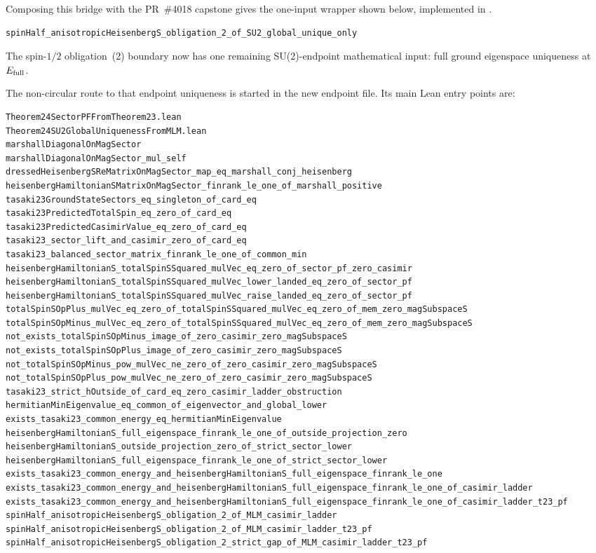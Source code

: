 \documentclass[a4paper,11pt]{article}
\begin{document}
Composing this bridge with the PR~\#4018 capstone gives the one-input wrapper
shown below, implemented in
.
\begin{Verbatim}
spinHalf_anisotropicHeisenbergS_obligation_2_of_SU2_global_unique_only
\end{Verbatim}
The spin-\(1/2\) obligation~(2) boundary now has one remaining SU(2)-endpoint
mathematical input: full ground eigenspace uniqueness at \(E_{\rm full}\).

The non-circular route to that endpoint uniqueness is started in the new
endpoint file.  Its main Lean entry points are:
\begin{Verbatim}
Theorem24SectorPFFromTheorem23.lean
Theorem24SU2GlobalUniquenessFromMLM.lean
marshallDiagonalOnMagSector
marshallDiagonalOnMagSector_mul_self
dressedHeisenbergSReMatrixOnMagSector_map_eq_marshall_conj_heisenberg
heisenbergHamiltonianSMatrixOnMagSector_finrank_le_one_of_marshall_positive
tasaki23GroundStateSectors_eq_singleton_of_card_eq
tasaki23PredictedTotalSpin_eq_zero_of_card_eq
tasaki23PredictedCasimirValue_eq_zero_of_card_eq
tasaki23_sector_lift_and_casimir_zero_of_card_eq
tasaki23_balanced_sector_matrix_finrank_le_one_of_common_min
heisenbergHamiltonianS_totalSpinSSquared_mulVec_eq_zero_of_sector_pf_zero_casimir
heisenbergHamiltonianS_totalSpinSSquared_mulVec_lower_landed_eq_zero_of_sector_pf
heisenbergHamiltonianS_totalSpinSSquared_mulVec_raise_landed_eq_zero_of_sector_pf
totalSpinSOpPlus_mulVec_eq_zero_of_totalSpinSSquared_mulVec_eq_zero_of_mem_zero_magSubspaceS
totalSpinSOpMinus_mulVec_eq_zero_of_totalSpinSSquared_mulVec_eq_zero_of_mem_zero_magSubspaceS
not_exists_totalSpinSOpMinus_image_of_zero_casimir_zero_magSubspaceS
not_exists_totalSpinSOpPlus_image_of_zero_casimir_zero_magSubspaceS
not_totalSpinSOpMinus_pow_mulVec_ne_zero_of_zero_casimir_zero_magSubspaceS
not_totalSpinSOpPlus_pow_mulVec_ne_zero_of_zero_casimir_zero_magSubspaceS
tasaki23_strict_hOutside_of_card_eq_zero_casimir_ladder_obstruction
hermitianMinEigenvalue_eq_common_of_eigenvector_and_global_lower
exists_tasaki23_common_energy_eq_hermitianMinEigenvalue
heisenbergHamiltonianS_full_eigenspace_finrank_le_one_of_outside_projection_zero
heisenbergHamiltonianS_outside_projection_zero_of_strict_sector_lower
heisenbergHamiltonianS_full_eigenspace_finrank_le_one_of_strict_sector_lower
exists_tasaki23_common_energy_and_heisenbergHamiltonianS_full_eigenspace_finrank_le_one
exists_tasaki23_common_energy_and_heisenbergHamiltonianS_full_eigenspace_finrank_le_one_of_casimir_ladder
exists_tasaki23_common_energy_and_heisenbergHamiltonianS_full_eigenspace_finrank_le_one_of_casimir_ladder_t23_pf
spinHalf_anisotropicHeisenbergS_obligation_2_of_MLM_casimir_ladder
spinHalf_anisotropicHeisenbergS_obligation_2_of_MLM_casimir_ladder_t23_pf
spinHalf_anisotropicHeisenbergS_obligation_2_strict_gap_of_MLM_casimir_ladder_t23_pf
\end{Verbatim}
\end{document}
